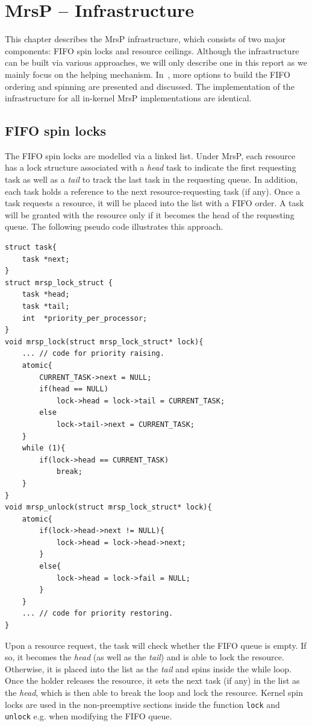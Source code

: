 \documentclass{report}
\begin{document}
\chapter{MrsP -- Infrastructure}
\label{MrsP Infrastructure}
This chapter describes the MrsP infrastructure, which consists of two major components: FIFO spin locks and resource ceilings. Although the infrastructure can be built via various approaches, we will only describe one in this report as we mainly focus on the helping mechanism. In~\cite{mezzetti2015challenges}, more options to build the FIFO ordering and spinning are presented and discussed. The implementation of the infrastructure for all in-kernel MrsP implementations are identical.

\section{FIFO spin locks}
The FIFO spin locks are modelled via a linked list. Under MrsP, each resource has a lock structure associated with a \emph{head} task to indicate the first requesting task as well as a \emph{tail} to track the last task in the requesting queue. In addition, each task holds a reference to the next resource-requesting task (if any). Once a task requests a resource, it will be placed into the list with a FIFO order. A task will be granted with the resource only if it becomes the head of the requesting queue. The following pseudo code illustrates this approach. 

\begin{lstlisting}
struct task{
	task *next;
}
struct mrsp_lock_struct {
	task *head;
	task *tail;
	int  *priority_per_processor;
}
void mrsp_lock(struct mrsp_lock_struct* lock){
	... // code for priority raising.
	atomic{
		CURRENT_TASK->next = NULL;
		if(head == NULL)
			lock->head = lock->tail = CURRENT_TASK;
		else
			lock->tail->next = CURRENT_TASK;
	}
	while (1){
		if(lock->head == CURRENT_TASK)
			break;	
	}
}
void mrsp_unlock(struct mrsp_lock_struct* lock){
	atomic{
		if(lock->head->next != NULL){
			lock->head = lock->head->next;
		}
		else{
			lock->head = lock->fail = NULL;	
		}
	}
	... // code for priority restoring.
}
\end{lstlisting}

Upon a resource request, the task will check whether the FIFO queue is empty. If so, it becomes the \emph{head} (as well as the \emph{tail}) and is able to lock the resource. Otherwise, it is placed into the list as the \emph{tail} and spins inside the while loop. Once the holder releases the resource, it sets the next task (if any) in the list as the \emph{head}, which is then able to break the loop and lock the resource.  Kernel spin locks are used in the non-preemptive sections inside the function \texttt{lock} and \texttt{unlock} e.g. when modifying the FIFO queue.
\end{document}
